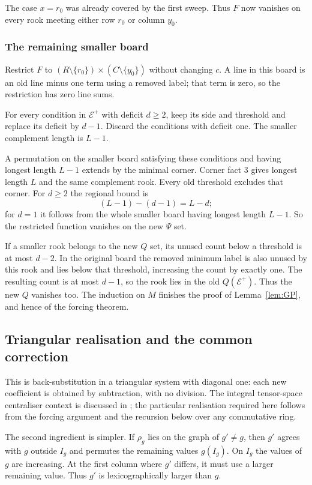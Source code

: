 \documentclass[11pt,a4paper]{article}
\theoremstyle{definition}\newtheorem{definition}[theorem]{Definition}
\theoremstyle{remark}\newtheorem{remark}[theorem]{Remark}
\begin{document}
The case $x=r_0$ was already covered by the first sweep. Thus $F$ now vanishes on every rook meeting either row $r_0$ or column $y_0$.

\subsubsection{The remaining smaller board}
Restrict $F$ to $(R\setminus\{r_0\})\times(C\setminus\{y_0\})$ without changing $c$. A line in this board is an old line minus one term using a removed label; that term is zero, so the restriction has zero line sums.

For every condition in $\mathcal E^+$ with deficit $d\ge2$, keep its side and threshold and replace its deficit by $d-1$. Discard the conditions with deficit one. The smaller complement length is $L-1$.

A permutation on the smaller board satisfying these conditions and having longest length $L-1$ extends by the minimal corner. Corner fact 3 gives longest length $L$ and the same complement rook. Every old threshold excludes that corner. For $d\ge2$ the regional bound is
\[(L-1)-(d-1)=L-d;
\]
for $d=1$ it follows from the whole smaller board having longest length $L-1$. So the restricted function vanishes on the new $\Psi$ set.

If a smaller rook belongs to the new $Q$ set, its unused count below a threshold is at most $d-2$. In the original board the removed minimum label is also unused by this rook and lies below that threshold, increasing the count by exactly one. The resulting count is at most $d-1$, so the rook lies in the old $Q(\mathcal E^+)$. Thus the new $Q$ vanishes too. The induction on $M$ finishes the proof of Lemma~\ref{lem:GP}, and hence of the forcing theorem.


\subsection{Triangular realisation and the common correction}\label{sec:realization}
This is back-substitution in a triangular system with diagonal one:
each new coefficient is obtained by subtraction, with no division.
The integral tensor-space centraliser context is discussed in
\cite{BDM}; the particular realisation required here follows from
the forcing argument and the recursion below over any commutative ring.

The second ingredient is simpler. If $\rho_g$ lies on the graph of $g'\ne g$, then $g'$ agrees with $g$ outside $I_g$ and permutes the remaining values $g(I_g)$. On $I_g$ the values of $g$ are increasing. At the first column where $g'$ differs, it must use a larger remaining value. Thus $g'$ is lexicographically larger than $g$.
\end{document}

